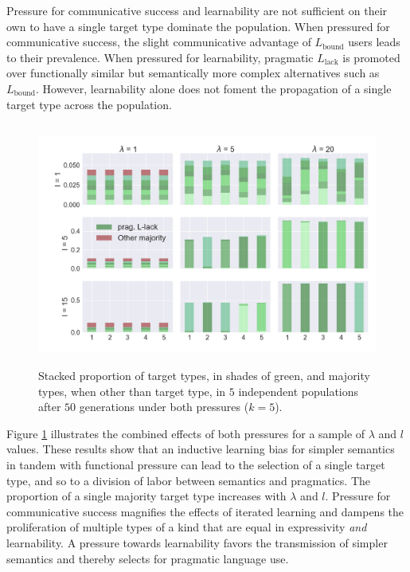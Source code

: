 \documentclass[a4paper, 11pt]{article}
\theoremstyle{Satz}
\newcommand{\mylang}[1]{\ensuremath{L_{\text{#1}}}\xspace} %
\newcommand{\Lbound}{\mylang{bound}}
\newcommand{\Llack}{\mylang{lack}}
\begin{document}
Pressure for communicative success and learnability are not sufficient on their own to have a
single target type dominate the population. When pressured for communicative success, the slight
communicative advantage of $\Lbound$ users leads to their prevalence. When pressured for
learnability, pragmatic $\Llack$ is promoted over functionally similar but semantically more
complex alternatives such as $\Lbound$. However, learnability alone does not foment the
propagation of a single target type across the population.

\begin{figure}[t]
\centering
\includegraphics[width=1\textwidth,height=8cm,keepaspectratio]{./plots/fig3-r+m}
\caption{Stacked proportion of target types, in shades of green, and majority types, when other than target type, in $5$ independent populations after $50$ generations under both pressures ($k = 5$).}
\label{fig:rmd}
\end{figure}

Figure \ref{fig:rmd} illustrates the combined effects of both pressures for a sample of
$\lambda$ and $l$ values. These results show that an inductive learning bias for simpler
semantics in tandem with functional pressure can lead to the selection of a single target
type, and so to a division of labor between semantics and pragmatics.
The proportion of a single majority target type increases with $\lambda$ and
$l$. Pressure for communicative success magnifies the effects of iterated learning and dampens
the proliferation of multiple types of a kind that are equal in expressivity {\em and} learnability. A
pressure towards learnability favors the transmission of simpler semantics and thereby selects
for pragmatic language use.
\end{document}
